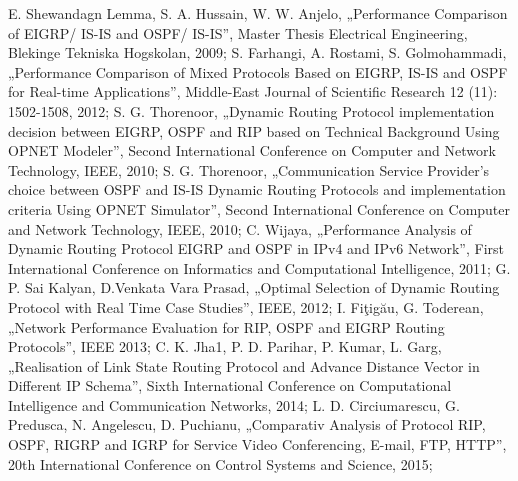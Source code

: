 \documentclass[conference,compsoc]{IEEEtran}
\begin{document}
%
%
%
\begin{thebibliography}{1}

E. Shewandagn Lemma, S. A. Hussain, W. W. Anjelo, „Performance Comparison of EIGRP/ IS-IS and OSPF/ IS-IS”, Master Thesis Electrical Engineering, Blekinge Tekniska Hogskolan, 2009;
S. Farhangi, A. Rostami, S. Golmohammadi, „Performance Comparison of Mixed Protocols Based on EIGRP, IS-IS and OSPF for Real-time Applications”, Middle-East Journal of Scientific Research 12 (11): 1502-1508, 2012;
S. G. Thorenoor, „Dynamic Routing Protocol implementation decision between EIGRP, OSPF and RIP based on Technical Background Using OPNET Modeler”, Second International Conference on Computer and Network Technology, IEEE, 2010;
S. G. Thorenoor, „Communication Service Provider’s choice between OSPF and IS-IS Dynamic Routing Protocols and implementation criteria Using OPNET Simulator”, Second International Conference on Computer and Network Technology, IEEE, 2010;
C. Wijaya, „Performance Analysis of Dynamic Routing Protocol EIGRP and OSPF in IPv4 and IPv6 Network”, First International Conference on Informatics and Computational Intelligence, 2011;
G. P. Sai Kalyan, D.Venkata Vara Prasad, „Optimal Selection of Dynamic Routing Protocol with Real Time Case Studies”, IEEE, 2012;
I. Fiţigău, G. Toderean, „Network Performance Evaluation for RIP, OSPF and EIGRP Routing Protocols”, IEEE 2013;
C. K. Jha1, P. D. Parihar, P. Kumar, L. Garg, „Realisation of Link State Routing Protocol and Advance Distance Vector in Different IP Schema”, Sixth International Conference on Computational Intelligence and Communication Networks, 2014;
L. D. Circiumarescu, G. Predusca, N. Angelescu, D. Puchianu, „Comparativ Analysis of Protocol RIP, OSPF, RIGRP and IGRP for Service Video Conferencing, E-mail, FTP, HTTP”, 20th International Conference on Control Systems and Science, 2015;

\end{thebibliography}
\end{document}
